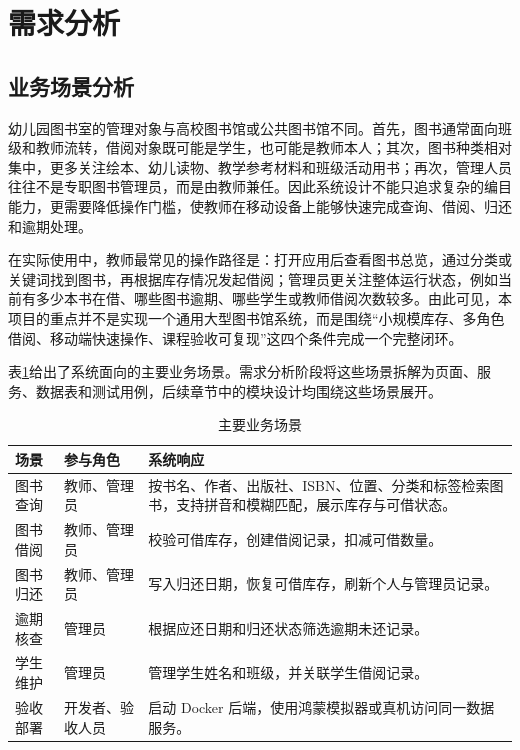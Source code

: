 \section{需求分析}

\subsection{业务场景分析}

幼儿园图书室的管理对象与高校图书馆或公共图书馆不同。首先，图书通常面向班级和教师流转，借阅对象既可能是学生，也可能是教师本人；其次，图书种类相对集中，更多关注绘本、幼儿读物、教学参考材料和班级活动用书；再次，管理人员往往不是专职图书管理员，而是由教师兼任。因此系统设计不能只追求复杂的编目能力，更需要降低操作门槛，使教师在移动设备上能够快速完成查询、借阅、归还和逾期处理。

在实际使用中，教师最常见的操作路径是：打开应用后查看图书总览，通过分类或关键词找到图书，再根据库存情况发起借阅；管理员更关注整体运行状态，例如当前有多少本书在借、哪些图书逾期、哪些学生或教师借阅次数较多。由此可见，本项目的重点并不是实现一个通用大型图书馆系统，而是围绕“小规模库存、多角色借阅、移动端快速操作、课程验收可复现”这四个条件完成一个完整闭环。

表\ref{tab:business-scenario}给出了系统面向的主要业务场景。需求分析阶段将这些场景拆解为页面、服务、数据表和测试用例，后续章节中的模块设计均围绕这些场景展开。

\begin{table}[htbp]
    \centering
    \caption{主要业务场景}
    \label{tab:business-scenario}
    \begin{tabularx}{0.95\textwidth}{l>{\RaggedRight\arraybackslash}X>{\RaggedRight\arraybackslash}X}
        \toprule
        \textbf{场景} & \textbf{参与角色} & \textbf{系统响应}                                     \\
        \midrule
        图书查询        & 教师、管理员        & 按书名、作者、出版社、ISBN、位置、分类和标签检索图书，支持拼音和模糊匹配，展示库存与可借状态。 \\
        图书借阅        & 教师、管理员        & 校验可借库存，创建借阅记录，扣减可借数量。                             \\
        图书归还        & 教师、管理员        & 写入归还日期，恢复可借库存，刷新个人与管理员记录。                         \\
        逾期核查        & 管理员           & 根据应还日期和归还状态筛选逾期未还记录。                              \\
        学生维护        & 管理员           & 管理学生姓名和班级，并关联学生借阅记录。                              \\
        验收部署        & 开发者、验收人员      & 启动 Docker 后端，使用鸿蒙模拟器或真机访问同一数据服务。                  \\
        \bottomrule
    \end{tabularx}
\end{table}

